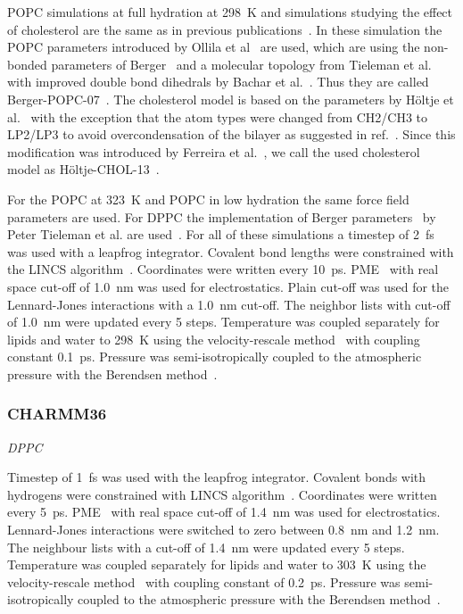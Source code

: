 \documentclass[journal=jacsat,manuscript=article]{achemso}
\begin{document}
POPC simulations at full hydration at 298~K and simulations studying the effect of cholesterol are the same as in previous publications~\cite{ferreira13,ferreira15}.
In these simulation the POPC parameters introduced by Ollila et al~\cite{ollila07a} are used, which are using the non-bonded parameters of Berger~\cite{berger97}
and a molecular topology from Tieleman et al.~\cite{tieleman99} with improved double bond dihedrals by Bachar et al.~\cite{bachar04}. 
Thus they are called Berger-POPC-07~\cite{ollila07a}. The cholesterol model is based on the parameters by H\"oltje et al.~\cite{holtje01} with the
exception that the atom types were changed from CH2/CH3 to LP2/LP3 to avoid overcondensation of the bilayer as suggested in ref.~\cite{tieleman06}.
Since this modification was introduced by Ferreira et al.~\cite{ferreira13}, we call the used cholesterol model as H\"oltje-CHOL-13~\cite{ferreira13}.

For the POPC at 323~K and POPC in low hydration the same force field parameters are used.
For DPPC the implementation of Berger parameters~\cite{berger97} by Peter Tieleman et al. are used~\cite{marrink98}.
For all of these simulations a timestep of 2~fs was used with a leapfrog integrator. Covalent bond lengths were constrained with the LINCS algorithm~\cite{hess97,hess07}. 
Coordinates were written every 10~ps. PME~\cite{darden93,essman95} with real space cut-off of 1.0~nm was used 
for electrostatics. Plain cut-off was used for the Lennard-Jones interactions with a 1.0~nm cut-off.
The neighbor lists with cut-off of 1.0~nm were updated every 5 steps. Temperature was coupled separately
for lipids and water to 298~K using the velocity-rescale method~\cite{bussi07} with coupling constant 0.1~ps.
Pressure was semi-isotropically coupled to the atmospheric pressure with the Berendsen method~\cite{berendsen84}.

\subsubsection{CHARMM36}

{\it DPPC}

Timestep of 1~fs was used with the leapfrog integrator. Covalent bonds with hydrogens were constrained with LINCS algorithm~\cite{hess97,hess07}. 
Coordinates were written every 5~ps. PME~\cite{darden93,essman95} with real space cut-off of 1.4~nm was used 
for electrostatics. Lennard-Jones interactions were switched to zero between 0.8~nm and 1.2~nm.
The neighbour lists with a cut-off of 1.4~nm were updated every 5 steps. Temperature was coupled separately
for lipids and water to 303~K using the velocity-rescale method~\cite{bussi07} with coupling constant of 0.2~ps.
Pressure was semi-isotropically coupled to the atmospheric pressure with the Berendsen method~\cite{berendsen84}.
\end{document}
